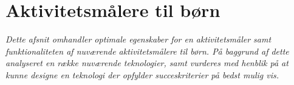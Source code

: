 \section{Aktivitetsmålere til børn} \label{tracker_intro}
\textit{Dette afsnit omhandler optimale egenskaber for en aktivitetsmåler samt funktionaliteten af nuværende aktivitetsmålere til børn. På baggrund af dette analyseret en række nuværende teknologier, samt vurderes med henblik på at kunne designe en teknologi der opfylder succeskriterier på bedst mulig vis.}
%

